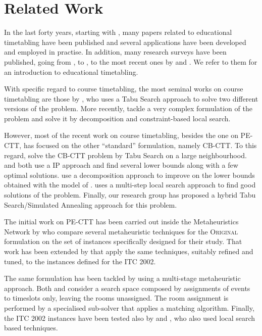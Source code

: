 \documentclass[authoryear,preprint,a4paper,12pt]{elsarticle}
\begin{document}
\section{Related Work}

In the last forty years, starting with \citet{Gotl63}, many papers
related to educational timetabling have been published and several
applications have been developed and employed in practise.  In
addition, many research surveys have been published, going from
\citet{Werr85}, to \citet{Scha99}, to the most recent ones by
\cite{BuPe02} and \cite{Lewi08}. We refer to them for an
introduction to educational timetabling.

With specific regard to course timetabling, the most seminal
works on course timetabling are those by
\citet{Hert91,Hert92}, who uses a Tabu Search approach to solve two
different versions of the problem. More recently, 
\citet{MuMR07} tackle a very complex formulation of the problem and
solve it by decomposition and constraint-based local search. 

However, most of the recent work on course timetabling, besides the
one on PE-CTT, has focused on the other ``standard''
formulation, namely CB-CTT.  To this regard, \citet{LuHa09} solve the
CB-CTT problem by Tabu Search on a large neighbourhood. \citet{LaLu10}
and \citet{BMPR10} both use a IP approach and find several lower
bounds along with a few optimal solutions.  \citet{HaBe11} use a
decomposition approach to improve on the lower bounds obtained with
the model of \citet{LaLu10}.  \cite{Mull09} uses a multi-step local
search approach to find good solutions of the problem. Finally, our
research group \citep{BeDS11} has proposed a hybrid Tabu
Search/Simulated Annealing approach for this problem.

The initial work on PE-CTT has been carried out inside the
Metaheuristics Network by \citet{RSBC03} who compare several
metaheuristic techniques for the \textsc{Original} formulation on
the set of instances specifically designed for their study. That work
has been extended by \citet{CBSR06} that apply the same techniques,
suitably refined and tuned, to the instances defined for the ITC 2002.

The same formulation has been tackled by \citet{Kost04} using a
multi-stage metaheuristic approach. Both \citeauthor{Kost04} and
\citeauthor{CBSR06} consider a search space composed by assignments of
events to timeslots only, leaving the rooms unassigned. The room
assignment is performed by a specialised sub-solver that applies a
matching algorithm. Finally, the ITC 2002 instances have been tested
also by \citet{BBNP03} and \citet{DiSc06}, who also used local search
based techniques.
\end{document}
